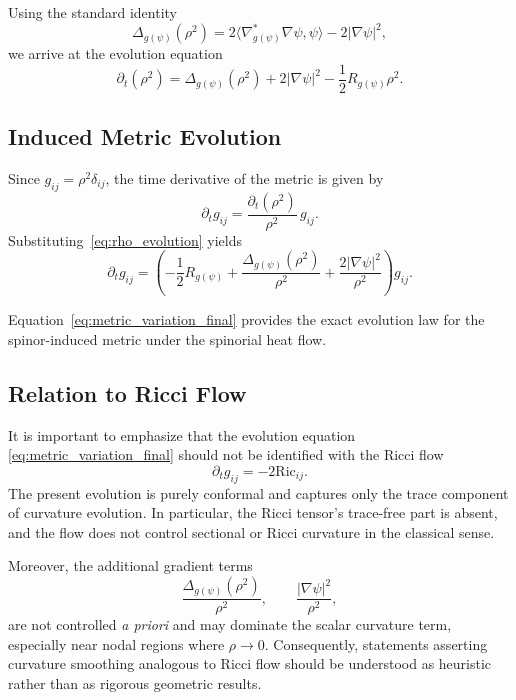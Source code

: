 \documentclass[11pt, reqno, a4paper]{amsart}
\theoremstyle{definition}
\theoremstyle{remark}
\begin{document}
Using the standard identity
\begin{equation}
\Delta_{g(\psi)} (\rho^2)
= 2 \langle \nabla^{*}_{g(\psi)} \nabla \psi , \psi \rangle
- 2 |\nabla \psi|^2 ,
\label{eq:laplacian_identity}
\end{equation}
we arrive at the evolution equation
\begin{equation}
\partial_t (\rho^2)
=
\Delta_{g(\psi)} (\rho^2)
+ 2 |\nabla \psi|^2
- \frac{1}{2} R_{g(\psi)} \rho^2 .
\label{eq:rho_evolution}
\end{equation}

\subsection{Induced Metric Evolution}

Since $g_{ij} = \rho^2 \delta_{ij}$, the time derivative of the metric is given by
\begin{equation}
\partial_t g_{ij}
=
\frac{\partial_t (\rho^2)}{\rho^2} \, g_{ij}.
\label{eq:metric_time_derivative}
\end{equation}
Substituting~\eqref{eq:rho_evolution} yields
\begin{equation}
\partial_t g_{ij}
=
\left(
- \frac{1}{2} R_{g(\psi)}
+ \frac{\Delta_{g(\psi)} (\rho^2)}{\rho^2}
+ \frac{2 |\nabla \psi|^2}{\rho^2}
\right) g_{ij}.
\label{eq:metric_variation_final}
\end{equation}

Equation~\eqref{eq:metric_variation_final} provides the exact evolution law
for the spinor-induced metric under the spinorial heat flow.

\subsection{Relation to Ricci Flow}

It is important to emphasize that the evolution equation
\eqref{eq:metric_variation_final} should not be identified with the Ricci flow
\[
\partial_t g_{ij} = -2 \mathrm{Ric}_{ij}.
\]
The present evolution is purely conformal and captures only the trace component
of curvature evolution. In particular, the Ricci tensor's trace-free part is absent, and the flow does not control sectional or Ricci curvature in the classical sense.

Moreover, the additional gradient terms
\[
\frac{\Delta_{g(\psi)} (\rho^2)}{\rho^2},
\qquad
\frac{|\nabla \psi|^2}{\rho^2},
\]
are not controlled \emph{a priori} and may dominate the scalar curvature term,
especially near nodal regions where $\rho \to 0$.
Consequently, statements asserting curvature smoothing analogous to Ricci flow
should be understood as heuristic rather than as rigorous geometric results.
\end{document}

